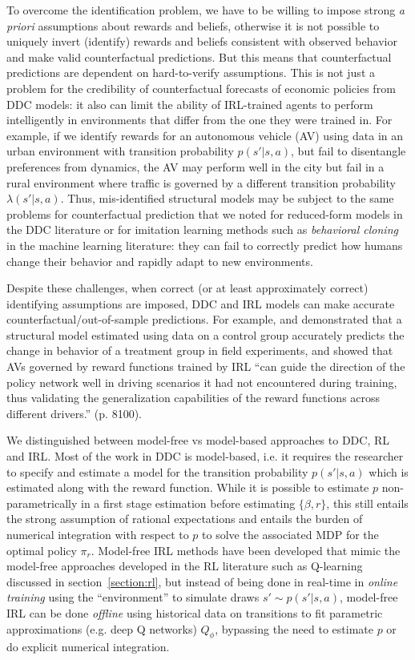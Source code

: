 To overcome the identification problem, we have to be willing
to impose strong {\it a priori\/} assumptions about rewards and beliefs, otherwise it is not possible to uniquely invert (identify) rewards and beliefs
consistent with observed behavior and make valid counterfactual predictions. But this means that counterfactual predictions are 
dependent on hard-to-verify assumptions. This is not just a problem for the credibility of counterfactual forecasts of economic
policies from DDC models: it also can limit the ability of IRL-trained agents to perform intelligently in 
environments that differ from the one they were trained in.
For example, if we identify rewards for an autonomous vehicle (AV) using data in an urban environment with transition probability $p(s'|s,a)$, but fail to disentangle preferences from dynamics,
the AV may perform well in the city but fail in a rural environment where traffic is  governed by a different transition probability $\lambda(s'|s,a)$.
Thus, mis-identified structural models may be subject to the same
problems  for counterfactual prediction that we noted for reduced-form models in the DDC literature
or for imitation learning methods such as {\it behavioral cloning\/} in the machine learning literature: they can fail to correctly predict
how humans change their behavior and rapidly adapt to new environments. 

Despite these challenges, when correct (or at least approximately correct) identifying assumptions are 
imposed, DDC and IRL models can make accurate counterfactual/out-of-sample predictions. For example, \citet{toddwolpin:2006} and \citet{lee:2026} demonstrated that a
structural model estimated using data on a control group accurately predicts the change in behavior
of a treatment group in field experiments, and \citet{zhuang:2024} showed that  AVs governed by reward functions trained by IRL
``can guide the direction of the policy network well in driving scenarios it had not encountered during training, thus validating the 
generalization capabilities of the reward functions across different drivers.'' (p. 8100).

We distinguished between  model-free vs model-based approaches to DDC, RL and IRL.
Most of the work in DDC is model-based, i.e. it requires the researcher to specify and estimate a model for the
transition probability $p(s'|s,a)$ which is estimated along with the reward function. While it is possible to estimate $p$ non-parametrically
in a first stage estimation before estimating $\{\beta,r\}$, this 
still entails the strong assumption of rational expectations and entails the burden of numerical integration with respect
to $p$ to solve the associated MDP for the optimal policy $\pi_r$. Model-free IRL methods have been developed that mimic the model-free
approaches developed in the RL literature such as Q-learning discussed in section~\ref{section:rl}, but instead of being done
in real-time in {\it online training\/} using the ``environment'' to simulate draws $s' \sim p(s'|s,a)$, model-free IRL can be done {\it offline\/} 
using historical data on transitions to fit parametric approximations (e.g. deep Q networks) $Q_\phi$, bypassing the need to estimate
$p$ or do explicit numerical integration.

